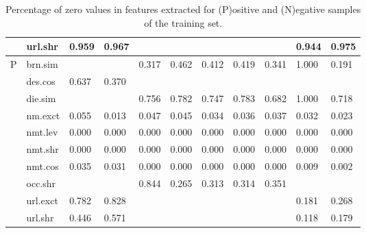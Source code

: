 \documentclass[epsfig,a4paper,11pt,titlepage,twoside,openany]{book}
\begin{document}
\begin{table}[H]
\begin{tabular}{ll|l|l|l|l|l|l|l|l|l|}
\multicolumn{1}{|l|}{}                                 & url.shr  & 0.959       & 0.967          &       &          &          &          &        & 0.944         & 0.975            \\ \hline \hline
\multicolumn{1}{|l|}{\multirow{10}{*}{P}}       & brn.sim  &             &                & 0.317 & 0.462    & 0.412    & 0.419    & 0.341  & 1.000         & 0.191            \\ \cline{2-11} 
\multicolumn{1}{|l|}{}                                 & des.cos  & 0.637       & 0.370          &       &          &          &          &        &               &                  \\ \cline{2-11} 
\multicolumn{1}{|l|}{}                                 & die.sim  &             &                & 0.756 & 0.782    & 0.747    & 0.783    & 0.682  & 1.000         & 0.718            \\ \cline{2-11} 
\multicolumn{1}{|l|}{}                                 & nm.exct  & 0.055       & 0.013          & 0.047 & 0.045    & 0.034    & 0.036    & 0.037  & 0.032         & 0.023            \\ \cline{2-11} 
\multicolumn{1}{|l|}{}                                 & nmt.lev  & 0.000       & 0.000          & 0.000 & 0.000    & 0.000    & 0.000    & 0.000  & 0.000         & 0.000            \\ \cline{2-11} 
\multicolumn{1}{|l|}{}                                 & nmt.shr  & 0.000       & 0.000          & 0.000 & 0.000    & 0.000    & 0.000    & 0.000  & 0.000         & 0.000            \\ \cline{2-11} 
\multicolumn{1}{|l|}{}                                 & nmt.cos  & 0.035       & 0.031          & 0.000 & 0.000    & 0.000    & 0.000    & 0.000  & 0.009         & 0.002            \\ \cline{2-11} 
\multicolumn{1}{|l|}{}                                 & occ.shr  &             &                & 0.844 & 0.265    & 0.313    & 0.314    & 0.351  &               &                  \\ \cline{2-11} 
\multicolumn{1}{|l|}{}                                 & url.exct & 0.782       & 0.828          &       &          &          &          &        & 0.181         & 0.268            \\ \cline{2-11} 
\multicolumn{1}{|l|}{}                                 & url.shr  & 0.446       & 0.571          &       &          &          &          &        & 0.118         & 0.179            \\ \hline
\end{tabular}
\caption{Percentage of zero values in features extracted for (P)ositive and (N)egative samples of the training set.}
\label{tab:features-percentage-of-nans-or-zeroes-pn}
\end{table}
\end{document}
